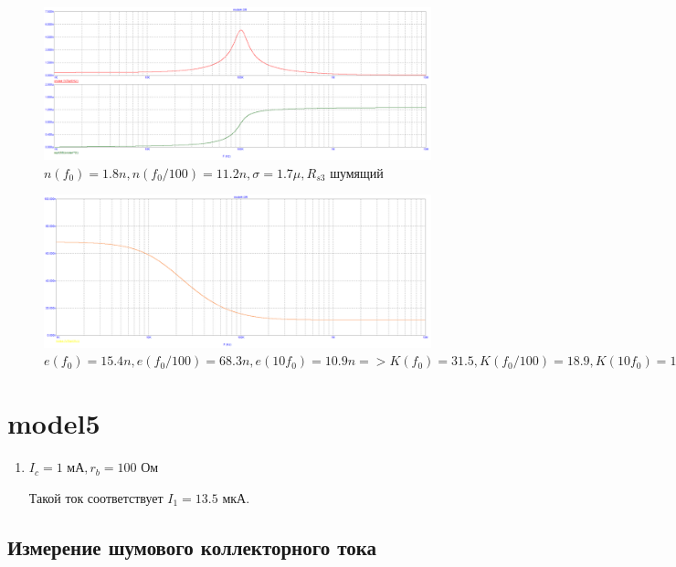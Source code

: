\documentclass[a4paper, 12pt]{article}%
\begin{document}
\begin{enumerate}
\begin{figure}[h!]
    \centering
    \includegraphics[scale=0.3]{images/mod4_3_2_3.png}
    \caption{$n(f_0) = 1.8n, n(f_0/100) = 11.2n, \sigma = 1.7\mu, R_{s3}$ шумящий}
    \label{fig:m4322}
\end{figure}

\begin{figure}[h!]
    \centering
    \includegraphics[scale=0.3]{images/mod4_3_3.png}
    \caption{$e(f_0) = 15.4n, e(f_0/100) = 68.3n, e(10 f_0) = 10.9n => K(f_0) = 31.5, K(f_0/100) = 18.9, K(10 f_0) = 15.8$}
    \label{fig:m433}
\end{figure}
\FloatBarrier


\end{enumerate}

\section{\textbf{model5}}

\begin{enumerate}

\item

\FloatBarrier
$I_c = 1 \text{ мА}, r_b = 100$ Ом

Такой ток соответствует $I_1 = 13.5$ мкА.

\end{enumerate}

\subsection*{Измерение шумового коллекторного тока}
\end{document}
